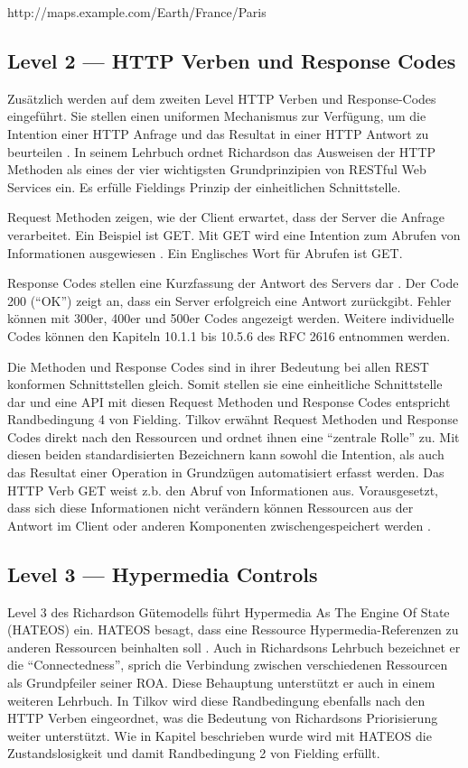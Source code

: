 http://maps.example.com/Earth/France/Paris

\subsection{Level 2 — HTTP Verben und Response Codes}\label{subsection:level-2}

Zusätzlich werden auf dem zweiten Level HTTP Verben und Response-Codes eingeführt. Sie stellen einen uniformen Mechanismus zur Verfügung, um die Intention einer HTTP Anfrage und das Resultat in einer HTTP Antwort zu beurteilen  . In seinem Lehrbuch ordnet Richardson das Ausweisen der HTTP Methoden als eines der vier wichtigsten Grundprinzipien von RESTful Web Services ein. Es erfülle Fieldings Prinzip der einheitlichen Schnittstelle.

Request Methoden zeigen, wie der Client erwartet, dass der Server die Anfrage verarbeitet. Ein Beispiel ist GET. Mit GET wird eine Intention zum Abrufen von Informationen ausgewiesen . Ein Englisches Wort für Abrufen ist GET. 

Response Codes stellen eine Kurzfassung der Antwort des Servers dar . Der Code 200 (“OK”) zeigt an, dass ein Server erfolgreich eine Antwort zurückgibt. Fehler können mit 300er, 400er und 500er Codes angezeigt werden. Weitere individuelle Codes können den Kapiteln 10.1.1 bis 10.5.6 des RFC 2616 entnommen werden. 

Die Methoden und Response Codes sind in ihrer Bedeutung bei allen REST konformen Schnittstellen gleich. Somit stellen sie eine einheitliche Schnittstelle dar und eine API mit diesen Request Methoden und Response Codes entspricht Randbedingung 4 von Fielding. Tilkov erwähnt Request Methoden und Response Codes direkt nach den Ressourcen und ordnet ihnen eine “zentrale Rolle” zu. Mit diesen beiden standardisierten Bezeichnern kann sowohl die Intention, als auch das Resultat einer Operation in Grundzügen automatisiert erfasst werden. Das HTTP Verb GET weist z.b. den Abruf von Informationen aus. Vorausgesetzt, dass sich diese Informationen nicht verändern können Ressourcen aus der Antwort im Client oder anderen Komponenten zwischengespeichert werden .

\subsection{Level 3 — Hypermedia Controls}\label{subsection:level-3}

Level 3 des Richardson Gütemodells führt Hypermedia As The Engine Of State (HATEOS) ein. HATEOS besagt, dass eine Ressource Hypermedia-Referenzen zu anderen Ressourcen beinhalten soll   . Auch in Richardsons Lehrbuch bezeichnet er die “Connectedness”, sprich die Verbindung zwischen verschiedenen Ressourcen als Grundpfeiler seiner ROA. Diese Behauptung unterstützt er auch in einem weiteren Lehrbuch. In Tilkov wird diese Randbedingung ebenfalls nach den HTTP Verben eingeordnet, was die Bedeutung von Richardsons Priorisierung weiter unterstützt. Wie in Kapitel beschrieben wurde wird mit HATEOS die Zustandslosigkeit und damit Randbedingung 2 von Fielding erfüllt. 

